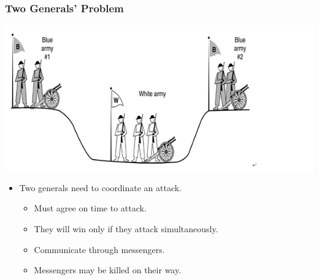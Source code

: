 

\begin{frame}
    \frametitle{Two Generals' Problem}
    \includegraphics[scale=0.5]{./figures/two-generals-problem.png}
    \begin{itemize}
        \item \alert{Two generals} need to coordinate an attack.
            \begin{itemize}
                \item Must \alert{agree} on time to attack.
                \item They will win only if they attack \alert{simultaneously}.
                \item Communicate through \alert{messengers}.
                \item Messengers may be \alert{killed} on their way.
            \end{itemize}
    \end{itemize}
\end{frame}

